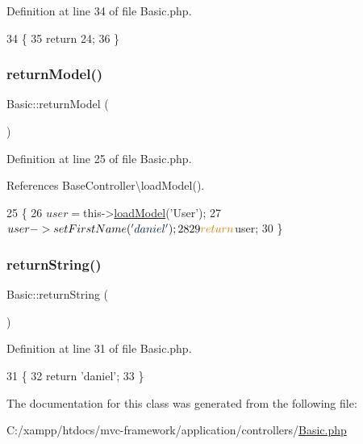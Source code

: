 Definition at line 34 of file Basic.\+php.


\begin{DoxyCode}
34                                 \{
35         \textcolor{keywordflow}{return} 24;
36     \}
\end{DoxyCode}
\hypertarget{class_basic_a68b47cdce3c867df841f6a29b8de624b}{}\label{class_basic_a68b47cdce3c867df841f6a29b8de624b} 
\subsubsection{\texorpdfstring{return\+Model()}{returnModel()}}
{\footnotesize\ttfamily Basic\+::return\+Model (\begin{DoxyParamCaption}{ }\end{DoxyParamCaption})}



Definition at line 25 of file Basic.\+php.



References Base\+Controller\textbackslash{}load\+Model().


\begin{DoxyCode}
25                                   \{
26         $user = $this->\hyperlink{class_base_controller_a31925ff6c6c23e4015d45a44c78a461b}{loadModel}(\textcolor{stringliteral}{'User'});
27         $user->setFirstName(\textcolor{stringliteral}{'daniel'});
28 
29         \textcolor{keywordflow}{return} $user;
30     \}
\end{DoxyCode}
\hypertarget{class_basic_a00d093f162848a1bd2e6e48d7cd68ab0}{}\label{class_basic_a00d093f162848a1bd2e6e48d7cd68ab0} 
\subsubsection{\texorpdfstring{return\+String()}{returnString()}}
{\footnotesize\ttfamily Basic\+::return\+String (\begin{DoxyParamCaption}{ }\end{DoxyParamCaption})}



Definition at line 31 of file Basic.\+php.


\begin{DoxyCode}
31                                    \{
32         \textcolor{keywordflow}{return} \textcolor{stringliteral}{'daniel'};
33     \}
\end{DoxyCode}


The documentation for this class was generated from the following file\+:\begin{DoxyCompactItemize}
\item 
C\+:/xampp/htdocs/mvc-\/framework/application/controllers/\hyperlink{controllers_2_basic_8php}{Basic.\+php}\end{DoxyCompactItemize}
